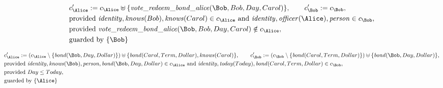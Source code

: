 \begin{align*}
&
c'_
{
\Alice
}
 := 
c_
{
\Alice
}
 \uplus 
\{
\mathit{\detokenize{
vote_redeem_bond_alice
}}
(
\Bob
,
Bob
,
Day
,
Carol
)
\}
, \qquad 
c'_
{
\Bob
}
 := 
c_
{
\Bob
}
,\\
&
\text{provided } 
\mathit{\detokenize{
identity
}}
,
\mathit{\detokenize{
knows
}}
(
Bob
)
,
\mathit{\detokenize{
knows
}}
(
Carol
)
 \in c_
{
\Alice
}
 \text{ and } 
\mathit{\detokenize{
identity
}}
,
\mathit{\detokenize{
officer
}}
(
\Alice
)
,
\mathit{\detokenize{
person
}}
 \in c_
{
\Bob
}
,\\
&
\text{provided } 
\mathit{\detokenize{
vote_redeem_bond_alice
}}
(
\Bob
,
Bob
,
Day
,
Carol
)
 \notin c_
{
\Alice
}
,\\
&
\text{guarded by } \{
\Bob
\}
\end{align*}

\begin{align*}
&
c'_
{
\Alice
}
 := 
(c_
{
\Alice
}
 \setminus 
\{
\mathit{\detokenize{
bond
}}
(
\Bob
,
Day
,
Dollar
)
\}
) \uplus 
\{
\mathit{\detokenize{
bond
}}
(
Carol
,
Term
,
Dollar
)
,
\mathit{\detokenize{
knows
}}
(
Carol
)
\}
, \qquad 
c'_
{
\Bob
}
 := 
(c_
{
\Bob
}
 \setminus 
\{
\mathit{\detokenize{
bond
}}
(
Carol
,
Term
,
Dollar
)
\}
) \uplus 
\{
\mathit{\detokenize{
bond
}}
(
\Bob
,
Day
,
Dollar
)
\}
,\\
&
\text{provided } 
\mathit{\detokenize{
identity
}}
,
\mathit{\detokenize{
knows
}}
(
\Bob
)
,
\mathit{\detokenize{
person
}}
,
\mathit{\detokenize{
bond
}}
(
\Bob
,
Day
,
Dollar
)
 \in c_
{
\Alice
}
 \text{ and } 
\mathit{\detokenize{
identity
}}
,
\mathit{\detokenize{
today
}}
(
Today
)
,
\mathit{\detokenize{
bond
}}
(
Carol
,
Term
,
Dollar
)
 \in c_
{
\Bob
}
,\\
&
\text{provided } 
Day
\le
Today
,\\
&
\text{guarded by } \{
\Alice
\}
\end{align*}

